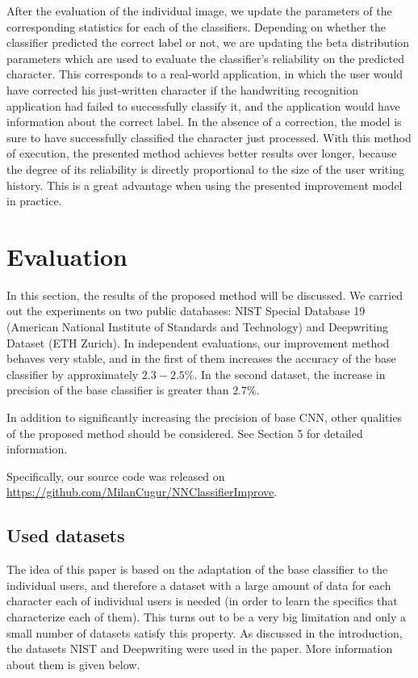 \documentclass{article}
\begin{document}
After the evaluation of the individual image, we update the parameters of the corresponding statistics for each of the classifiers. 
Depending on whether the classifier predicted the correct label or not, we are updating the beta distribution parameters which are used to evaluate the classifier's reliability on the predicted character. 
This corresponds to a real-world application, in which the user would have corrected his just-written character if the handwriting recognition application had failed to successfully classify it, 
and the application would have information about the correct label. 
In the absence of a correction, the model is sure to have successfully classified the character just processed. 
With this method of execution, the presented method achieves better results over longer, because the degree of its reliability is directly proportional to the size of the user writing history. 
This is a great advantage when using the presented improvement model in practice.  

\section{Evaluation}

In this section, the results of the proposed method will be discussed. 
We carried out the experiments on two public databases: NIST Special Database 19 (American National Institute of Standards and Technology) and 
Deepwriting Dataset (ETH Zurich). %
In independent evaluations, our improvement method behaves very stable, and in the first of them increases the accuracy of the base classifier by approximately $2.3-2.5\%$. 
In the second dataset, the increase in precision of the base classifier is greater than $2.7\%$. 

In addition to significantly increasing the precision of base CNN, other qualities of the proposed method should be considered. 
See Section 5 for detailed information. %

Specifically, our source code was released on \url{https://github.com/MilanCugur/NNClassifierImprove}.

\subsection{Used datasets}

The idea of this paper is based on the adaptation of the base classifier to the individual users, 
and therefore a dataset with a large amount of data for each character each of individual users is needed 
(in order to learn the specifics that characterize each of them). 
This turns out to be a very big limitation and only a small number of datasets satisfy this property. 
As discussed in the introduction, the datasets NIST and Deepwriting were used in the paper. 
More information about them is given below. 
\end{document}

